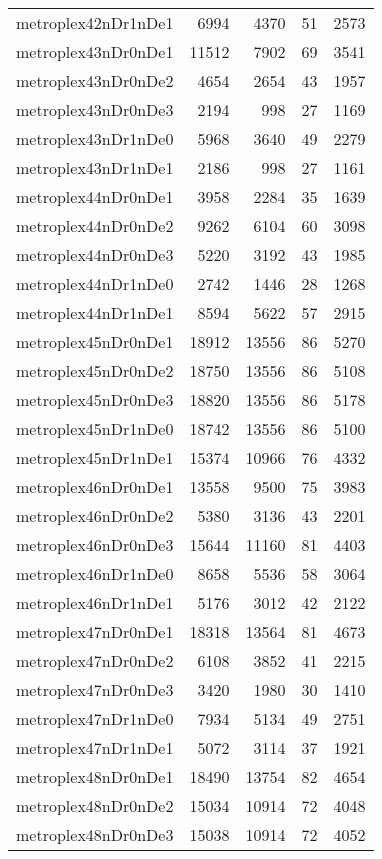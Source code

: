 \begin{longtable}{lrrrr}
metroplex42nDr1nDe1 & 6994 & 4370 & 51 & 2573 \\
metroplex43nDr0nDe1 & 11512 & 7902 & 69 & 3541 \\
metroplex43nDr0nDe2 & 4654 & 2654 & 43 & 1957 \\
metroplex43nDr0nDe3 & 2194 & 998 & 27 & 1169 \\
metroplex43nDr1nDe0 & 5968 & 3640 & 49 & 2279 \\
metroplex43nDr1nDe1 & 2186 & 998 & 27 & 1161 \\
metroplex44nDr0nDe1 & 3958 & 2284 & 35 & 1639 \\
metroplex44nDr0nDe2 & 9262 & 6104 & 60 & 3098 \\
metroplex44nDr0nDe3 & 5220 & 3192 & 43 & 1985 \\
metroplex44nDr1nDe0 & 2742 & 1446 & 28 & 1268 \\
metroplex44nDr1nDe1 & 8594 & 5622 & 57 & 2915 \\
metroplex45nDr0nDe1 & 18912 & 13556 & 86 & 5270 \\
metroplex45nDr0nDe2 & 18750 & 13556 & 86 & 5108 \\
metroplex45nDr0nDe3 & 18820 & 13556 & 86 & 5178 \\
metroplex45nDr1nDe0 & 18742 & 13556 & 86 & 5100 \\
metroplex45nDr1nDe1 & 15374 & 10966 & 76 & 4332 \\
metroplex46nDr0nDe1 & 13558 & 9500 & 75 & 3983 \\
metroplex46nDr0nDe2 & 5380 & 3136 & 43 & 2201 \\
metroplex46nDr0nDe3 & 15644 & 11160 & 81 & 4403 \\
metroplex46nDr1nDe0 & 8658 & 5536 & 58 & 3064 \\
metroplex46nDr1nDe1 & 5176 & 3012 & 42 & 2122 \\
metroplex47nDr0nDe1 & 18318 & 13564 & 81 & 4673 \\
metroplex47nDr0nDe2 & 6108 & 3852 & 41 & 2215 \\
metroplex47nDr0nDe3 & 3420 & 1980 & 30 & 1410 \\
metroplex47nDr1nDe0 & 7934 & 5134 & 49 & 2751 \\
metroplex47nDr1nDe1 & 5072 & 3114 & 37 & 1921 \\
metroplex48nDr0nDe1 & 18490 & 13754 & 82 & 4654 \\
metroplex48nDr0nDe2 & 15034 & 10914 & 72 & 4048 \\
metroplex48nDr0nDe3 & 15038 & 10914 & 72 & 4052 \\

\end{longtable}
